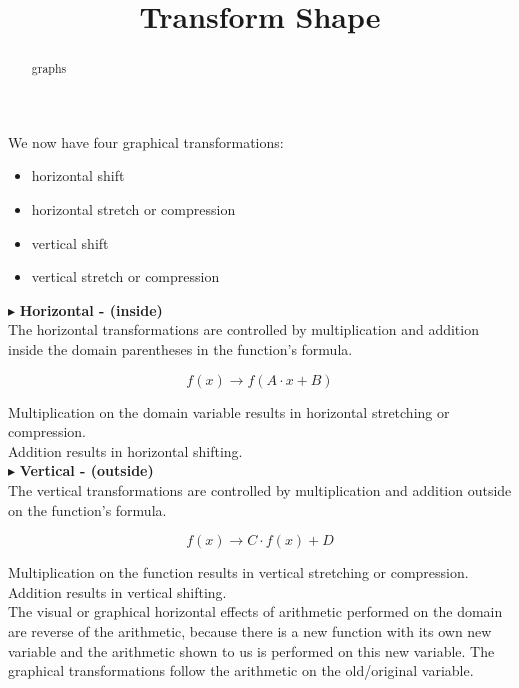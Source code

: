 \documentclass{ximera}
\title{Transform Shape}
\begin{document}
\begin{abstract}
graphs
\end{abstract}
\maketitle



We now have four graphical transformations:


\begin{itemize}
\item horizontal shift
\item horizontal stretch or compression
\item vertical shift
\item vertical stretch or compression
\end{itemize}






$\blacktriangleright$  \textbf{\textcolor{purple!85!blue}{Horizontal - (inside)}}  \\


The horizontal transformations are controlled by multiplication and addition inside the domain parentheses in the function's formula.

\[      f(x) \longrightarrow   f(A \cdot x + B)  \]

Multiplication on the domain variable results in horizontal stretching or compression. \\
Addition results in horizontal shifting. \\





$\blacktriangleright$   \textbf{\textcolor{purple!85!blue}{Vertical - (outside)}}  \\



The vertical transformations are controlled by multiplication and addition outside on the function's formula.

\[      f(x) \longrightarrow   C \cdot f(x) + D \]

Multiplication on the function results in vertical stretching or compression. \\
Addition results in vertical shifting. \\





The visual or graphical horizontal effects of arithmetic performed on the domain are reverse of the arithmetic, because  there is a new function with its own new variable and the arithmetic shown to us is performed on this new variable.  The graphical transformations follow the arithmetic on the old/original variable.
\end{document}
